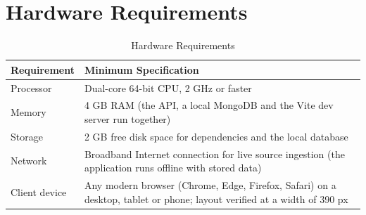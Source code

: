 \documentclass[12pt,a4paper]{report}
\begin{document}
\section{Hardware Requirements}
\begin{table}[H]
\centering
\caption{Hardware Requirements}
\begin{tabularx}{\textwidth}{|l|X|}
\hline
\textbf{Requirement} & \textbf{Minimum Specification} \\
\hline
Processor & Dual-core 64-bit CPU, 2 GHz or faster \\
\hline
Memory & 4 GB RAM (the API, a local MongoDB and the Vite dev server run together) \\
\hline
Storage & 2 GB free disk space for dependencies and the local database \\
\hline
Network & Broadband Internet connection for live source ingestion (the application runs offline with stored data) \\
\hline
Client device & Any modern browser (Chrome, Edge, Firefox, Safari) on a desktop, tablet or phone; layout verified at a width of 390 px \\
\hline
\end{tabularx}
\end{table}
\end{document}
